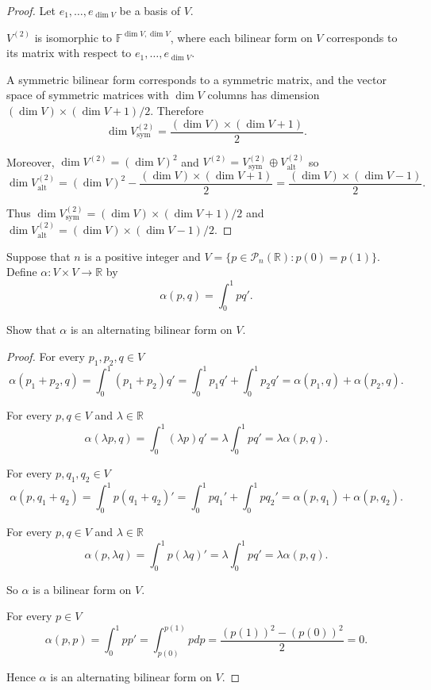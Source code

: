 \begin{proof}
    Let $e_{1}, \ldots, e_{\dim V}$ be a basis of $V$.

    $V^{(2)}$ is isomorphic to $\mathbb{F}^{\dim V,\dim V}$, where each bilinear form on $V$ corresponds to its matrix with respect to $e_{1}, \ldots, e_{\dim V}$.

    A symmetric bilinear form corresponds to a symmetric matrix, and the vector space of symmetric matrices with $\dim V$ columns has dimension $(\dim V)\times(\dim V + 1)/2$. Therefore
    \[
        \dim V^{(2)}_{\text{sym}} = \frac{(\dim V) \times (\dim V + 1)}{2}.
    \]

    Moreover, $\dim V^{(2)} = {(\dim V)}^{2}$ and $V^{(2)} = V^{(2)}_{\text{sym}}\oplus V^{(2)}_{\text{alt}}$ so
    \[
        \dim V^{(2)}_{\text{alt}} = {(\dim V)}^{2} - \frac{(\dim V) \times (\dim V + 1)}{2} = \frac{(\dim V)\times (\dim V - 1)}{2}.
    \]

    Thus $\dim V^{(2)}_{\text{sym}} = (\dim V)\times(\dim V + 1)/2$ and $\dim V^{(2)}_{\text{alt}} = (\dim V)\times(\dim V - 1)/2$.
\end{proof}
\newpage

\begin{exercise}\label{chapter9:sectionA:exercise9}
    Suppose that $n$ is a positive integer and $V = \{ p\in\mathscr{P}_{n}(\mathbb{R}): p(0) = p(1) \}$. Define $\alpha: V\times V\to\mathbb{R}$ by
    \[
        \alpha(p, q) = \int^{1}_{0}pq'.
    \]

    Show that $\alpha$ is an alternating bilinear form on $V$.
\end{exercise}

\begin{proof}
    For every $p_{1}, p_{2}, q \in V$
    \[
        \alpha(p_{1} + p_{2}, q) = \int^{1}_{0}(p_{1} + p_{2})q' = \int^{1}_{0}p_{1}q' + \int^{1}_{0}p_{2}q' = \alpha(p_{1}, q) + \alpha(p_{2}, q).
    \]

    For every $p, q\in V$ and $\lambda\in\mathbb{R}$
    \[
        \alpha(\lambda p, q) = \int^{1}_{0}(\lambda p)q' = \lambda\int^{1}_{0}pq' = \lambda\alpha(p, q).
    \]

    For every $p, q_{1}, q_{2}\in V$
    \[
        \alpha(p, q_{1} + q_{2}) = \int^{1}_{0}p(q_{1} + q_{2})' = \int^{1}_{0}pq_{1}' + \int^{1}_{0}pq_{2}' = \alpha(p, q_{1}) + \alpha(p, q_{2}).
    \]

    For every $p, q\in V$ and $\lambda\in\mathbb{R}$
    \[
        \alpha(p, \lambda q) = \int^{1}_{0}p(\lambda q)' = \lambda\int^{1}_{0}pq' = \lambda\alpha(p, q).
    \]

    So $\alpha$ is a bilinear form on $V$.

    For every $p\in V$
    \[
        \alpha(p, p) = \int^{1}_{0}pp' = \int^{p(1)}_{p(0)}pdp = \frac{{(p(1))}^{2} - {(p(0))}^{2}}{2} = 0.
    \]

    Hence $\alpha$ is an alternating bilinear form on $V$.
\end{proof}
\newpage

